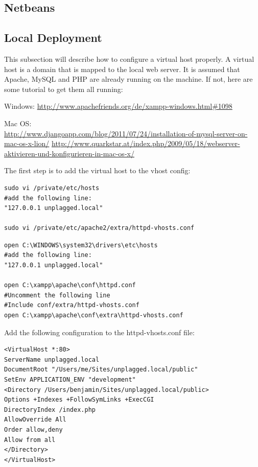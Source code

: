 \subsection{Netbeans}

\subsection{Local Deployment}

This subsection will describe how to configure a virtual host properly. A virtual host is a domain that is mapped to 
the local web server. It is assumed that Apache, MySQL and PHP are already running on the machine. If not, here are 
some tutorial to get them all running:

Windows: \url{http://www.apachefriends.org/de/xampp-windows.html#1098}

Mac OS:\\
\url{http://www.djangoapp.com/blog/2011/07/24/installation-of-mysql-server-on-mac-os-x-lion/} 
\url{http://www.quarkstar.at/index.php/2009/05/18/webserver-aktivieren-und-konfigurieren-in-mac-os-x/}

The first step is to add the virtual host to the vhost config: 

\begin{lstlisting}[caption=Mac OS X: Creating virtual host]
sudo vi /private/etc/hosts
#add the following line:
"127.0.0.1 unplagged.local"

sudo vi /private/etc/apache2/extra/httpd-vhosts.conf
\end{lstlisting}

\begin{lstlisting}[caption=Windows: Creating a virtual host]
open C:\WINDOWS\system32\drivers\etc\hosts
#add the following line:
"127.0.0.1 unplagged.local"

open C:\xampp\apache\conf\httpd.conf
#Uncomment the following line
#Include conf/extra/httpd-vhosts.conf
open C:\xampp\apache\conf\extra\httpd-vhosts.conf
\end{lstlisting}

Add the following configuration to the httpd-vhosts.conf file:

\begin{lstlisting}[caption=Apache configuration]
<VirtualHost *:80>
ServerName unplagged.local
DocumentRoot "/Users/me/Sites/unplagged.local/public" 
SetEnv APPLICATION_ENV "development" 
<Directory /Users/benjamin/Sites/unplagged.local/public>
Options +Indexes +FollowSymLinks +ExecCGI
DirectoryIndex /index.php
AllowOverride All
Order allow,deny
Allow from all
</Directory>
</VirtualHost>
\end{lstlisting}

